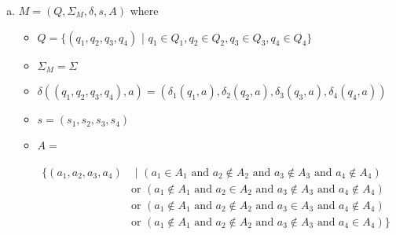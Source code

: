 \documentclass[11pt]{article}
\begin{document}
\begin{solution}
\begin{enumerate}[(a)]
\item $M=(Q,\Sigma_M, \delta, s, A)$ where
\begin{itemize}
\item $Q=\{ (q_1, q_2, q_3, q_4)$ | $q_1\in Q_1, q_2\in Q_2, q_3\in Q_3, q_4\in Q_4 \}$
\item $\Sigma_M = \Sigma$
\item $\delta((q_1,q_2,q_3,q_4), a)=(\delta_1(q_1,a), \delta_2(q_2,a), \delta_3(q_3,a), \delta_4(q_4,a))$
\item $s=(s_1, s_2, s_3, s_4)$
\item $A=$\\\\
\begin{math}
    \begin{array}{ll}
      	\{ (a_1, a_2, a_3, a_4) &\text{ | } 
			(a_1\in A_1 \text{ and } a_2\notin A_2 \text{ and } a_3\notin A_3 \text{ and } a_4\notin A_4)\\
			&\text{or } (a_1\notin A_1 \text{ and } a_2\in A_2 \text{ and } a_3\notin A_3 \text{ and } a_4\notin A_4)\\
			&\text{or } (a_1\notin A_1 \text{ and } a_2\notin A_2 \text{ and } a_3\in A_3 \text{ and } a_4\notin A_4)\\
			&\text{or } (a_1\notin A_1 \text{ and } a_2\notin A_2 \text{ and } a_3\notin A_3 \text{ and } a_4\in A_4)
		\}
    \end{array}
\end{math}\\
\end{itemize}
\end{enumerate}
\end{solution}
\end{document}
